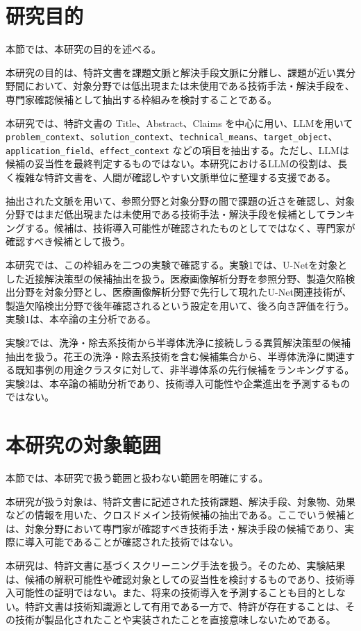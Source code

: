 \section{研究目的}

本節では、本研究の目的を述べる。

本研究の目的は、特許文書を課題文脈と解決手段文脈に分離し、課題が近い異分野間において、対象分野では低出現または未使用である技術手法・解決手段を、専門家確認候補として抽出する枠組みを検討することである。

本研究では、特許文書の Title、Abstract、Claims を中心に用い、LLMを用いて \texttt{problem\_context}、\texttt{solution\_context}、\texttt{technical\_means}、\texttt{target\_object}、\texttt{application\_field}、\texttt{effect\_context} などの項目を抽出する。ただし、LLMは候補の妥当性を最終判定するものではない。本研究におけるLLMの役割は、長く複雑な特許文書を、人間が確認しやすい文脈単位に整理する支援である。

抽出された文脈を用いて、参照分野と対象分野の間で課題の近さを確認し、対象分野ではまだ低出現または未使用である技術手法・解決手段を候補としてランキングする。候補は、技術導入可能性が確認されたものとしてではなく、専門家が確認すべき候補として扱う。

本研究では、この枠組みを二つの実験で確認する。実験1では、U-Netを対象とした近接解決策型の候補抽出を扱う。医療画像解析分野を参照分野、製造欠陥検出分野を対象分野とし、医療画像解析分野で先行して現れたU-Net関連技術が、製造欠陥検出分野で後年確認されるという設定を用いて、後ろ向き評価を行う。実験1は、本卒論の主分析である。

実験2では、洗浄・除去系技術から半導体洗浄に接続しうる異質解決策型の候補抽出を扱う。花王の洗浄・除去系技術を含む候補集合から、半導体洗浄に関連する既知事例の用途クラスタに対して、非半導体系の先行候補をランキングする。実験2は、本卒論の補助分析であり、技術導入可能性や企業進出を予測するものではない。

\section{本研究の対象範囲}

本節では、本研究で扱う範囲と扱わない範囲を明確にする。

本研究が扱う対象は、特許文書に記述された技術課題、解決手段、対象物、効果などの情報を用いた、クロスドメイン技術候補の抽出である。ここでいう候補とは、対象分野において専門家が確認すべき技術手法・解決手段の候補であり、実際に導入可能であることが確認された技術ではない。

本研究は、特許文書に基づくスクリーニング手法を扱う。そのため、実験結果は、候補の解釈可能性や確認対象としての妥当性を検討するものであり、技術導入可能性の証明ではない。また、将来の技術導入を予測することも目的としない。特許文書は技術知識源として有用である一方で、特許が存在することは、その技術が製品化されたことや実装されたことを直接意味しないためである。

